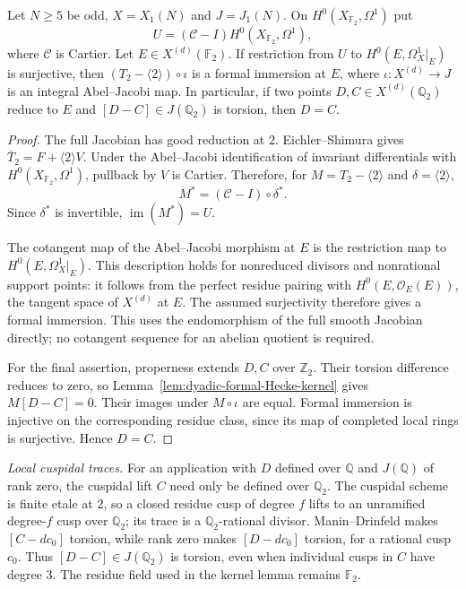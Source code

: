 \begin{corollary}\label{cor:dyadic-Cartier-formal-immersion}
Let $N\geq5$ be odd, $X=X_1(N)$ and $J=J_1(N)$.
On $H^0(X_{\mathbb F_2},\Omega^1)$ put
\[
 U=(\mathcal C-I)H^0(X_{\mathbb F_2},\Omega^1),
\]
where $\mathcal C$ is Cartier.
Let $E\in X^{(d)}(\mathbb F_2)$.
If restriction from $U$ to $H^0(E,\Omega^1_X|_E)$ is surjective,
then $(T_2-\langle2\rangle)\circ\iota$ is a formal immersion at $E$,
where $\iota:X^{(d)}\to J$ is an integral Abel--Jacobi map.
In particular, if two points $D,C\in X^{(d)}(\mathbb Q_2)$ reduce
to $E$ and $[D-C]\in J(\mathbb Q_2)$ is torsion, then $D=C$.
\end{corollary}
\begin{proof}
The full Jacobian has good reduction at $2$.
Eichler--Shimura gives $\overline T_2=F+\langle2\rangle V$.
Under the Abel--Jacobi identification of invariant differentials
with $H^0(X_{\mathbb F_2},\Omega^1)$, pullback by $V$ is Cartier.
Therefore, for $M=T_2-\langle2\rangle$ and $\delta=\langle2\rangle$,
\[
 M^*=(\mathcal C-I)\circ\delta^*.
\]
Since $\delta^*$ is invertible, $\operatorname{im}(M^*)=U$.

The cotangent map of the Abel--Jacobi morphism at $E$ is the
restriction map to $H^0(E,\Omega_X^1|_E)$.
This description holds for nonreduced divisors and nonrational
support points: it follows from the perfect residue pairing with
$H^0(E,\mathcal O_E(E))$, the tangent space of $X^{(d)}$ at $E$.
The assumed surjectivity therefore gives a formal immersion.
This uses the endomorphism of the full smooth Jacobian directly;
no cotangent sequence for an abelian quotient is required.

For the final assertion, properness extends $D,C$ over
$\mathbb Z_2$. Their torsion difference reduces to zero, so
Lemma~\ref{lem:dyadic-formal-Hecke-kernel} gives $M[D-C]=0$.
Their images under $M\circ\iota$ are equal.
Formal immersion is injective on the corresponding residue class,
since its map of completed local rings is surjective.
Hence $D=C$.
\end{proof}

\noindent\emph{Local cuspidal traces.}
For an application with $D$ defined over $\mathbb Q$ and $J(\mathbb Q)$
of rank zero, the cuspidal lift $C$ need only be defined over
$\mathbb Q_2$.
The cuspidal scheme is finite etale at $2$, so a closed residue cusp
of degree $f$ lifts to an unramified degree-$f$ cusp over
$\mathbb Q_2$; its trace is a $\mathbb Q_2$-rational divisor.
Manin--Drinfeld makes $[C-dc_0]$ torsion, while rank zero makes
$[D-dc_0]$ torsion, for a rational cusp $c_0$.
Thus $[D-C]\in J(\mathbb Q_2)$ is torsion, even when individual
cusps in $C$ have degree $3$.
The residue field used in the kernel lemma remains $\mathbb F_2$.

